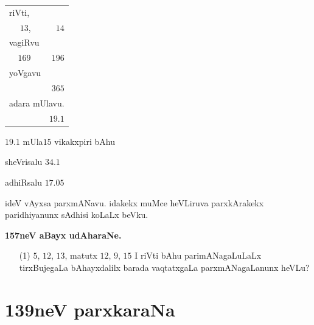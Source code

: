 \medskip

\begin{tabular}{rr}
\multicolumn{2}{l}{riVti,}\\
$13$, & $14$\\[5pt]
\multicolumn{2}{l}{vagiRvu}\\
$169$ & $196$\\[5pt]
\multicolumn{2}{l}{yoVgavu}\\
 & $365$\\[5pt]
\multicolumn{2}{l}{adara mUlavu.}\\
 & $19.1$
\end{tabular}

\medskip

$19.1$ mUla\qquad $15$ vikakxpiri bAhu

sheVrisalu $34.1$

adhiRsalu $17.05$

ideV vAyxsa parxmANavu. idakekx muMce heVLiruva parxkArakekx
paridhiyanunx sAdhisi koLaLx beVku.

\medskip
\begin{center}
{\large\bf 157neV aBayx udAharaNe.}
\end{center}

\begin{itemize}
\item[\rm(1)] $5$, $12$, $13$, matutx $12$, $9$, $15$ I riVti bAhu
parimANagaLuLaLx tirxBujegaLa bAhayxdalilx barada vaqtatxgaLa
parxmANagaLanunx heVLu?
\end{itemize}

\chapter{139neV parxkaraNa}

